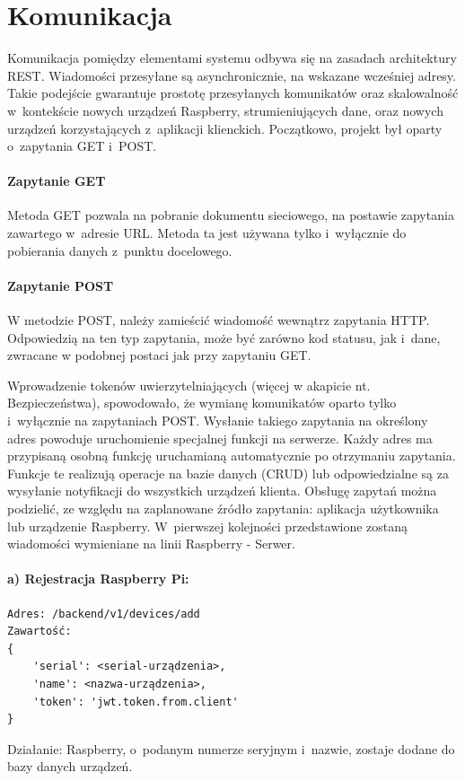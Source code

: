 \section{Komunikacja}

Komunikacja pomiędzy elementami systemu odbywa się na zasadach architektury REST. Wiadomości przesyłane są asynchronicznie, na wskazane wcześniej adresy.
Takie podejście gwarantuje prostotę przesyłanych komunikatów oraz skalowalność w~kontekście nowych urządzeń Raspberry, strumieniujących dane, oraz nowych urządzeń korzystających z~aplikacji klienckich. Początkowo, projekt był oparty o~zapytania GET i~POST.  \cite{WEBARCH}

\paragraph{Zapytanie GET}
Metoda GET pozwala na pobranie dokumentu sieciowego, na postawie zapytania zawartego w~adresie URL. Metoda ta jest używana tylko i~wyłącznie do pobierania danych z~punktu docelowego. 

\paragraph{Zapytanie POST}
W metodzie POST, należy zamieścić wiadomość wewnątrz zapytania HTTP. Odpowiedzią na ten typ zapytania, może być zarówno kod statusu, jak i~dane, zwracane w podobnej postaci jak przy zapytaniu GET.

Wprowadzenie tokenów uwierzytelniających (więcej w akapicie nt. Bezpieczeństwa), spowodowało, że wymianę komunikatów oparto tylko i~wyłącznie na zapytaniach POST. Wysłanie takiego zapytania na określony adres powoduje uruchomienie specjalnej funkcji na serwerze. Każdy adres ma przypisaną osobną funkcję uruchamianą automatycznie po otrzymaniu zapytania. Funkcje te realizują operacje na bazie danych (CRUD) lub odpowiedzialne są za wysyłanie notyfikacji do wszystkich urządzeń klienta.
Obsługę zapytań można podzielić, ze względu na zaplanowane źródło zapytania: aplikacja użytkownika lub urządzenie Raspberry.
W~pierwszej kolejności przedstawione zostaną wiadomości wymieniane na linii Raspberry - Serwer.
\paragraph{a) Rejestracja Raspberry Pi:}
\begin{verbatim}
Adres: /backend/v1/devices/add
Zawartość:
{
	'serial': <serial-urządzenia>, 
	'name': <nazwa-urządzenia>, 
	'token': 'jwt.token.from.client'
}
\end{verbatim}
Działanie: Raspberry, o~podanym numerze seryjnym i~nazwie, zostaje dodane do bazy danych urządzeń.

